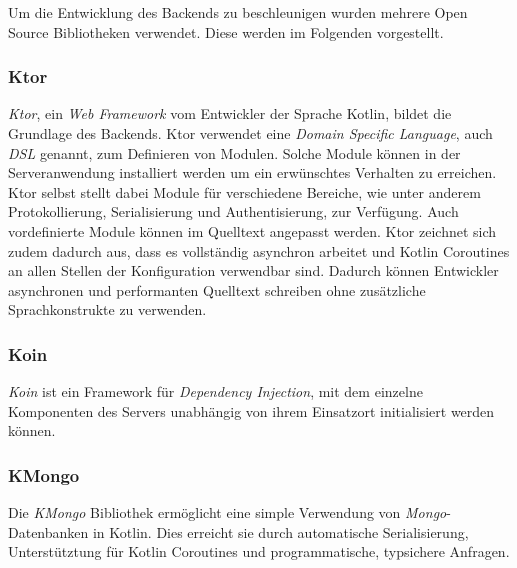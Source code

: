 \documentclass[a4paper, 11pt]{article}
\begin{document}
Um die Entwicklung des Backends zu beschleunigen wurden mehrere Open Source Bibliotheken verwendet.
Diese werden im Folgenden vorgestellt.

\subsubsection{Ktor}
\label{subsubsec:backend:bibs:ktor}

\textit{Ktor}, ein \textit{Web Framework} vom Entwickler der Sprache Kotlin, bildet die Grundlage des Backends.
Ktor verwendet eine \textit{Domain Specific Language}, auch \textit{DSL} genannt, zum Definieren von Modulen.
Solche Module können in der Serveranwendung installiert werden um ein erwünschtes Verhalten zu erreichen.
Ktor selbst stellt dabei Module für verschiedene Bereiche, wie unter anderem Protokollierung, Serialisierung und Authentisierung, zur Verfügung.
Auch vordefinierte Module können im Quelltext angepasst werden.
Ktor zeichnet sich zudem dadurch aus, dass es vollständig asynchron arbeitet und Kotlin Coroutines an allen Stellen der Konfiguration verwendbar sind.
Dadurch können Entwickler asynchronen und performanten Quelltext schreiben ohne zusätzliche Sprachkonstrukte zu verwenden.

\subsubsection{Koin}
\label{subsubsec:backend:bibs:koin}

\textit{Koin} ist ein Framework für \textit{Dependency Injection}, mit dem einzelne Komponenten des Servers unabhängig von ihrem Einsatzort initialisiert werden können.

\subsubsection{KMongo}
\label{subsubsec:backend:bibs:kmongo}

Die \textit{KMongo} Bibliothek ermöglicht eine simple Verwendung von \textit{Mongo}-Datenbanken in Kotlin.
Dies erreicht sie durch automatische Serialisierung, Unterstütztung für Kotlin Coroutines und programmatische, typsichere Anfragen.
\end{document}
